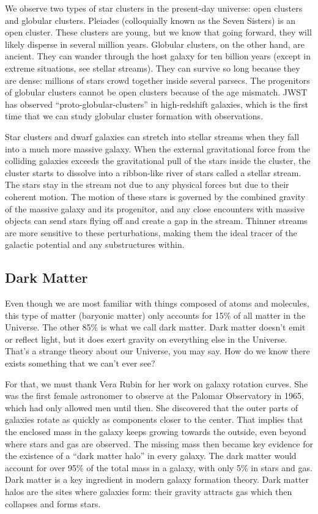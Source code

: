 We observe two types of star clusters in the present-day universe: open clusters and globular clusters. Pleiades (colloquially known as the Seven Sisters) is an open cluster. These clusters are young, but we know that going forward, they will likely disperse in several million years. Globular clusters, on the other hand, are ancient. They can wander through the host galaxy for ten billion years (except in extreme situations, see stellar streams). They can survive so long because they are dense: millions of stars crowd together inside several parsecs. The progenitors of globular clusters cannot be open clusters because of the age mismatch. JWST has observed “proto-globular-clusters” in high-redshift galaxies, which is the first time that we can study globular cluster formation with observations.

Star clusters and dwarf galaxies can stretch into stellar streams when they fall into a much more massive galaxy. When the external gravitational force from the colliding galaxies exceeds the gravitational pull of the stars inside the cluster, the cluster starts to dissolve into a ribbon-like river of stars called a stellar stream. The stars stay in the stream not due to any physical forces but due to their coherent motion. The motion of these stars is governed by the combined gravity of the massive galaxy and its progenitor, and any close encounters with massive objects can send stars flying off and create a gap in the stream. Thinner streams are more sensitive to these perturbations, making them the ideal tracer of the galactic potential and any substructures within.

\subsection{Dark Matter}
Even though we are most familiar with things composed of atoms and molecules, this type of matter (baryonic matter) only accounts for 15\% of all matter in the Universe. The other 85\% is what we call dark matter. Dark matter doesn’t emit or reflect light, but it does exert gravity on everything else in the Universe. That’s a strange theory about our Universe, you may say. How do we know there exists something that we can’t ever see?

For that, we must thank Vera Rubin for her work on galaxy rotation curves. She was the first female astronomer to observe at the Palomar Observatory in 1965, which had only allowed men until then. She discovered that the outer parts of galaxies rotate as quickly as components closer to the center. That implies that the enclosed mass in the galaxy keeps growing towards the outside, even beyond where stars and gas are observed. The missing mass then became key evidence for the existence of a ``dark matter halo'' in every galaxy. The dark matter would account for over 95\% of the total mass in a galaxy, with only 5\% in stars and gas. Dark matter is a key ingredient in modern galaxy formation theory. Dark matter halos are the sites where galaxies form: their gravity attracts gas which then collapses and forms stars. 

